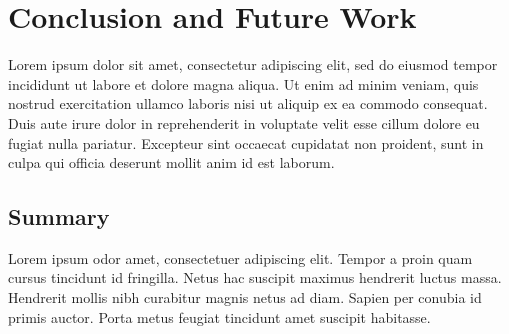 \documentclass[10pt,twocolumn,letterpaper]{article}
\begin{document}
\section{Conclusion and Future Work}\label{sec:conclusion-and-future-work}

Lorem ipsum dolor sit amet, consectetur adipiscing elit, sed do eiusmod tempor
incididunt ut labore et dolore magna aliqua. Ut enim ad minim veniam, quis
nostrud exercitation ullamco laboris nisi ut aliquip ex ea commodo consequat.
Duis aute irure dolor in reprehenderit in voluptate velit esse cillum dolore eu
fugiat nulla pariatur. Excepteur sint occaecat cupidatat non proident, sunt in
culpa qui officia deserunt mollit anim id est laborum.


\subsection{Summary}

Lorem ipsum odor amet, consectetuer adipiscing elit. Tempor a proin quam cursus
tincidunt id fringilla. Netus hac suscipit maximus hendrerit luctus massa.
Hendrerit mollis nibh curabitur magnis netus ad diam. Sapien per conubia id
primis auctor. Porta metus feugiat tincidunt amet suscipit habitasse.


    {\small
        
        
    }
\end{document}
